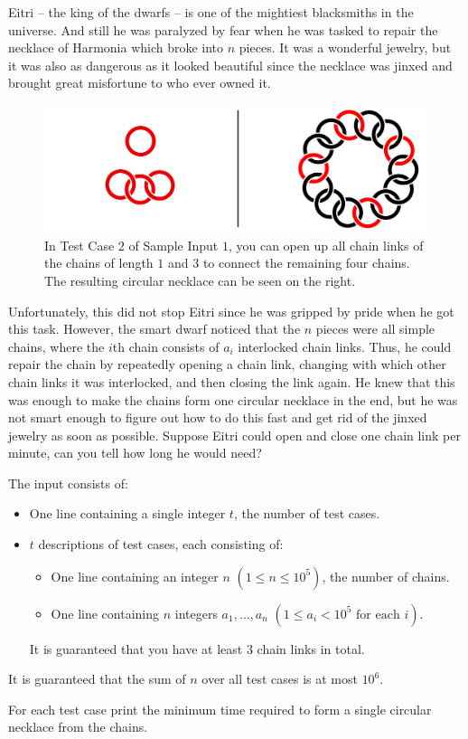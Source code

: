 
Eitri -- the king of the dwarfs -- is one of the mightiest blacksmiths in the universe.
And still he was paralyzed by fear when he was tasked to repair the necklace of Harmonia which broke into $n$ pieces.
It was a wonderful jewelry, but it was also as dangerous as it looked beautiful since the necklace was jinxed and brought great misfortune to who ever owned it.

\begin{figure}[h]
	\centering
	\includegraphics[width=0.75\linewidth]{example}
	\caption{In Test Case $2$ of Sample Input $1$, you can open up all chain links of the chains of length $1$ and $3$ to connect the remaining four chains.
		The resulting circular necklace can be seen on the right.}
\end{figure}

Unfortunately, this did not stop Eitri since he was gripped by pride when he got this task.
However, the smart dwarf noticed that the $n$ pieces were all simple chains, where the $i$th chain consists of $a_i$ interlocked chain links.
Thus, he could repair the chain by repeatedly opening a chain link, changing with which other chain links it was interlocked, and then closing the link again.
He knew that this was enough to make the chains form one circular necklace in the end, but he was not smart enough to figure out how to do this fast and get rid of the jinxed jewelry as soon as possible.
Suppose Eitri could open and close one chain link per minute, can you tell how long he would need?

\begin{Input}
	The input consists of:
	\begin{itemize}
		\item One line containing a single integer $t$, the number of test cases.
		\item $t$ descriptions of test cases, each consisting of:
			\begin{itemize}
				\item One line containing an integer $n$ $(1\leq n \leq 10^5)$, the
					number of chains.
				\item One line containing $n$ integers $a_1,\dots,a_n$ $(1\leq
					a_i < 10^5 \text{ for each $i$})$.
			\end{itemize}
		It is guaranteed that you have at least $3$ chain links in total.
	\end{itemize}
	It is guaranteed that the sum of $n$ over all test cases is at most $10^6$.
\end{Input}

\begin{Output}
	For each test case print the minimum time required to form a single circular necklace from the chains.
\end{Output}
